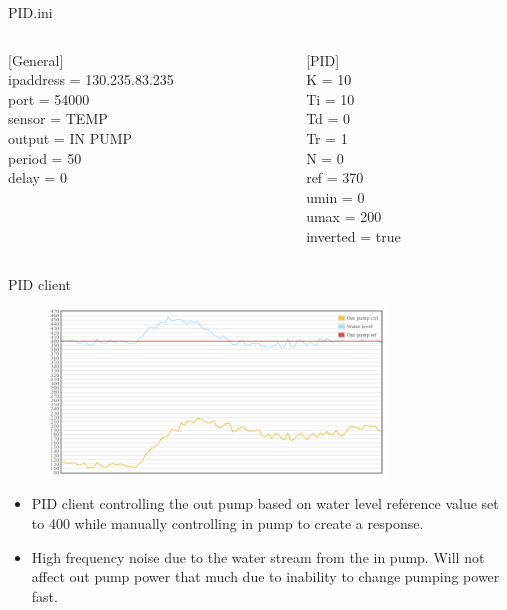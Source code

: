 \documentclass{beamer}
\begin{document}
\begin{frame}{PID.ini}
\begin{columns}[T]
	\begin{column}{.5\textwidth}
[General]\\
ipaddress = 130.235.83.235\\
port = 54000\\
sensor = TEMP\\
output = IN PUMP\\
period = 50\\
delay = 0\\
	\end{column}

	\begin{column}{.5\textwidth}
[PID]\\
K = 10\\
Ti = 10\\
Td = 0\\
Tr = 1\\
N = 0\\
ref = 370\\
umin = 0\\
umax = 200\\
inverted = true\\
	\end{column}
\end{columns}
\end{frame}

\begin{frame}{PID client}
	\begin{figure}
		\center
		\includegraphics[width=0.8\textwidth]{plot1.png}
	\end{figure}
	\begin{itemize}
		\item PID client controlling the out pump based on water level reference value set to 400 while manually controlling in pump to create a response.
		\item High frequency noise due to the water stream from the in pump. Will not affect out pump power that much due to inability to change pumping power fast.
    \end{itemize}
\end{frame}
\end{document}
